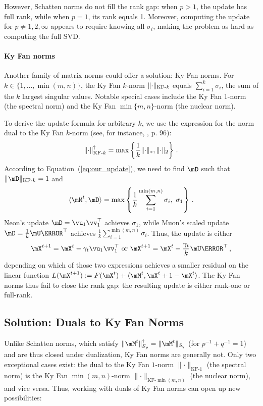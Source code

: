 \documentclass[smallextended,referee,envcountsect]{svjour3}
\newcommand{\norm}[1]{\lVert #1\rVert}
\DeclarePairedDelimiter{\norms}{\|}{\|_{\mathrm{2}}}
\DeclarePairedDelimiter{\normn}{\|}{\|_{*}}
\DeclarePairedDelimiter{\normkfk}{\|}{\|_{\text{KF-}k}}
\def\<#1,#2>{\langle #1,#2\rangle}
\newcommand{\equationref}[1]{Equation~(\ref{#1})}
\begin{document}
 However, Schatten norms do not fill the rank gap: when $p > 1$, the update has full rank, while when $p=1$, its rank equals 1. Moreover, computing the update for $p \neq 1, 2, \infty$ appears to require knowing all $\sigma_i$, making the problem as hard as computing the full SVD.
 
 \paragraph{Ky Fan norms}
 Another family of matrix norms could offer a solution: Ky Fan norms. For $k \in \{1, \dots, \min(m, n)\}$, the Ky Fan $k$-norm $\normkfk{\cdot}$ equals $\sum_{i=1}^{k}\sigma_i$, the sum of the $k$ largest singular values. Notable special cases include the Ky Fan $1$-norm (the spectral norm) and the Ky Fan $\min\{m, n\}$-norm (the nuclear norm).
 
 To derive the update formula for arbitrary $k$, we use the expression for the norm dual to the Ky Fan $k$-norm (see, for instance, \citep{bhatia2013matrix}, p. 96):
 \[
     \normkfk{\cdot}^\dagger = \max\left\{\frac{1}{k} \normn{\cdot}, \norms{\cdot}\right\}\,.
 \]
 According to \equationref{eq:our_update}, we need to find $\mD$ such that $\normkfk{\mD} = 1$ and
 \[
 \<\mM^t, \mD> = \max\left\{\frac{1}{k}\sum_{i=1}^{\min(m,n)}\sigma_i,\ \sigma_1\right\}\,.
 \]
 Neon's update $\mD = \vu_1 \vv_1^\top$ achieves $\sigma_1$, while Muon's scaled update $\mD = \frac{1}{k}\mU\mV^\top$ achieves $\frac{1}{k}\sum_{i=1}^{\min(m,n)}\sigma_i$. Thus, the update is either
 \[
 \mX^{t+1} = \mX^{t} - \gamma_t \vu_1 \vv_1^\top\text{ or }\mX^{t+1} = \mX^{t} - \frac{\gamma_t}{k}\mU \mV^\top\,,
 \]
 depending on which of those two expressions achieves a smaller residual on the linear function $L(\mX^{t+1}) := F(\mX^t) + \<\mM^t, \mX^{t+1} - \mX^t>$. The Ky Fan norms thus fail to close the rank gap: the resulting update is either rank-one or full-rank.
 
 \subsection{Solution: Duals to Ky Fan Norms}
 
 Unlike Schatten norms, which satisfy $\norm{\mM^t}_{S_p}^\dagger = \norm{\mM^t}_{S_q}$ (for $p^{-1} + q^{-1} = 1$) and are thus closed under dualization, Ky Fan norms are generally not. Only two exceptional cases exist: the dual to the Ky Fan $1$-norm $\norm{\cdot}_{\text{KF-}1}$ (the spectral norm) is the Ky Fan $\min(m,n)$-norm $\norm{\cdot}_{\text{KF-}\min(m,n)}$ (the nuclear norm), and vice versa. Thus, working with duals of Ky Fan norms can open up new possibilities:
 
\end{document}
